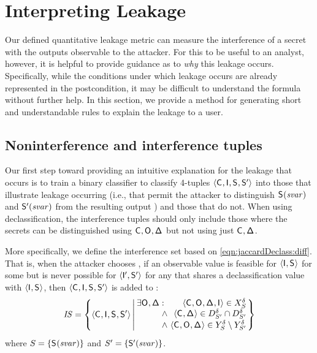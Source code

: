 \section{Interpreting Leakage}
\label{dinome:sec:interpret}

Our defined quantitative leakage metric can measure the interference
of a secret with the outputs observable to the attacker.  For this to
be useful to an analyst, however, it is helpful to provide guidance as
to \textit{why} this leakage occurs.  Specifically, while the
conditions under which leakage occurs are already represented in the
postcondition, it may be difficult to understand the formula without
further help. In this section, we provide a method for generating
short and understandable rules to explain the leakage to a user. 

\subsection{Noninterference and interference tuples}
\label{dinome:sec:interpret:samples}
Our first step toward providing an intuitive explanation 
for the leakage that occurs is to train a binary classifier to
classify 4-tuples
$\langle\mathsf{C}_{},\mathsf{I}_{},\mathsf{S}_{},\mathsf{S}'_{}\rangle$ into those that
illustrate leakage occurring (i.e., that permit the attacker to
distinguish $\mathsf{S}_{}(\mathit{svar})$ and $\mathsf{S}'_{}(\mathit{svar})$ from
the resulting output \AOOFn{}) and those that do not.  When using
declassification, the interference tuples should only include those
where the secrets can be distinguished using
$\mathsf{C}_{},\mathsf{O}_{},\mathsf{\Delta}_{}$ but not using just $\mathsf{C}_{},\mathsf{\Delta}_{}$.

More specifically, we define the interference set \interferenceSet
based on \eqref{eqn:jaccardDeclass:diff}. That is, when the attacker
chooses \ACIFn{}, if an observable value is feasible for $\langle
\mathsf{I}_{}, \mathsf{S}_{}\rangle$ for some \AIIFn{} but is never possible for
$\langle \mathsf{I}'_{}, \mathsf{S}'_{}\rangle$ for any \AIIFnAlt{} that
shares a declassification value with $\langle \mathsf{I}_{},
\mathsf{S}_{}\rangle$, then $\langle\mathsf{C}_{}, \mathsf{I}_{}, \mathsf{S}_{},
\mathsf{S}'_{}\rangle$ is added to \interferenceSet:
\begin{align}
\interferenceSet 
= \left\{\langle\ACIFn{},\AIIFn{},\SecFn{},\SecFnAlt{}\rangle
\left| \begin{array}[m]{@{\hspace{0.2em}}r@{\hspace{0.25em}}r@{}} 
  \exists \AOOFn{},\DCFn{}
  &:~\hfill \langle \ACIFn{},\AOOFn{},\DCFn{},\AIIFn{}\rangle \in \possibleTriplesWithDeclass{\secretsSet{}}\\
  &\wedge~\hfill
  \langle \ACIFn{},\DCFn{}\rangle \in \possibleDeclass{\secretsSetAlt{}}\cap\possibleDeclass{\secretsSetAlt{}}\\
  &\wedge~\hfill
  \langle \ACIFn{},\AOOFn{},\DCFn{}\rangle \in \possibleDoubleWithDeclass{\secretsSet{}}\setminus\possibleDoubleWithDeclass{\secretsSetAlt{}}
\end{array} 
\right.\right\}
\label{eqn:interferenceSet}
\end{align}
where $S_{} = \{\mathsf{S}_{}(\mathit{svar})\}$ and $S_{}'
= \{\mathsf{S}'_{}(\mathit{svar})\}$.
 
